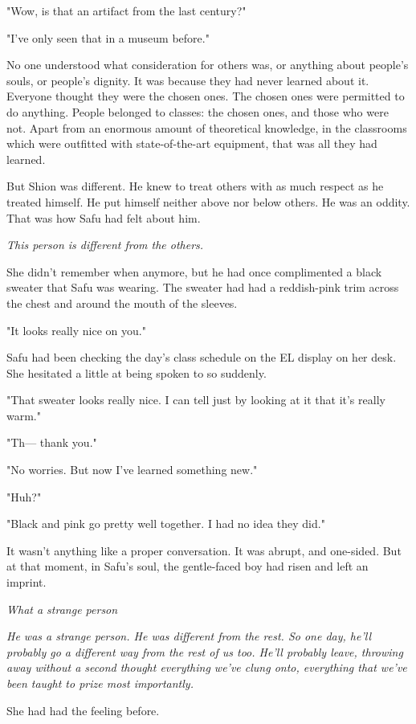 "Wow, is that an artifact from the last century?"

"I've only seen that in a museum before."

No one understood what consideration for others was, or anything about
people's souls, or people's dignity. It was because they had never
learned about it. Everyone thought they were the chosen ones. The chosen
ones were permitted to do anything. People belonged to classes: the
chosen ones, and those who were not. Apart from an enormous amount of
theoretical knowledge, in the classrooms which were outfitted with
state-of-the-art equipment, that was all they had learned.

But Shion was different. He knew to treat others with as much respect as
he treated himself. He put himself neither above nor below others. He
was an oddity. That was how Safu had felt about him.

\emph{This person is different from the others.}

She didn't remember when anymore, but he had once complimented a black
sweater that Safu was wearing. The sweater had had a reddish-pink trim
across the chest and around the mouth of the sleeves.

"It looks really nice on you."

Safu had been checking the day's class schedule on the EL display on her
desk. She hesitated a little at being spoken to so suddenly.

"That sweater looks really nice. I can tell just by looking at it that
it's really warm."

"Th--- thank you."

"No worries. But now I've learned something new."

"Huh?"

"Black and pink go pretty well together. I had no idea they did."

It wasn't anything like a proper conversation. It was abrupt, and
one-sided. But at that moment, in Safu's soul, the gentle-faced boy had
risen and left an imprint.

\emph{What a strange person\el }

\emph{He was a strange person. He was different from the rest. So one day,
he'll probably go a different way from the rest of us too. He'll
probably leave, throwing away without a second thought everything we've
clung onto, everything that we've been taught to prize most importantly.}

She had had the feeling before.


